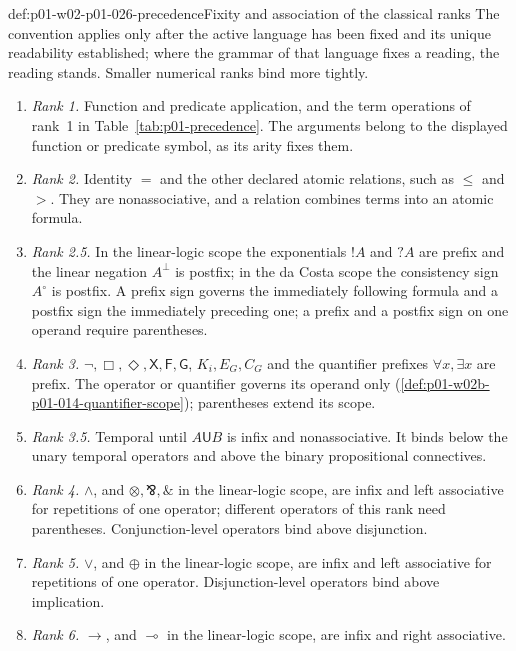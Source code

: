 \begin{hbconvention}{def:p01-w02-p01-026-precedence}{Fixity and association of the classical ranks}
The convention applies only after the active language has been fixed and
its unique readability established; where the grammar of that language
fixes a reading, the reading stands.  Smaller numerical ranks bind more
tightly.
\begin{enumerate}
\item \emph{Rank 1.}  Function and predicate application, and the term
  operations of rank~1 in Table~\ref{tab:p01-precedence}.  The arguments
  belong to the displayed function or predicate symbol, as its arity fixes
  them.
\item \emph{Rank 2.}  Identity \(=\) and the other declared atomic
  relations, such as \(\leq\) and \(>\).  They are nonassociative, and a
  relation combines terms into an atomic formula.
\item \emph{Rank 2.5.}  In the linear-logic scope the exponentials \(!A\)
  and \(?A\) are prefix and the linear negation \(A^\perp\) is postfix; in
  the da Costa scope the consistency sign \(A^\circ\) is postfix.  A prefix
  sign governs the immediately following formula and a postfix sign the
  immediately preceding one; a prefix and a postfix sign on one operand
  require parentheses.
\item \emph{Rank 3.}  \(\neg,\Box,\Diamond,\mathsf X,\mathsf F,\mathsf G\),
  \(K_i,E_G,C_G\) and the quantifier prefixes \(\forall x,\exists x\) are
  prefix.  The operator or quantifier governs its operand only
  (\cref{def:p01-w02b-p01-014-quantifier-scope}); parentheses extend its
  scope.
\item \emph{Rank 3.5.}  Temporal until \(A\mathbin{\mathsf U}B\) is infix
  and nonassociative.  It binds below the unary temporal operators and
  above the binary propositional connectives.
\item \emph{Rank 4.}  \(\land\), and \(\otimes,\bindnasrepma,\mathbin{\&}\)
  in the linear-logic scope, are infix and left associative for repetitions
  of one operator; different operators of this rank need parentheses.
  Conjunction-level operators bind above disjunction.
\item \emph{Rank 5.}  \(\lor\), and \(\oplus\) in the linear-logic scope,
  are infix and left associative for repetitions of one operator.
  Disjunction-level operators bind above implication.
\item \emph{Rank 6.}  \(\to\), and \(\multimap\) in the linear-logic
  scope, are infix and right associative.

\end{enumerate}
\end{hbconvention}
